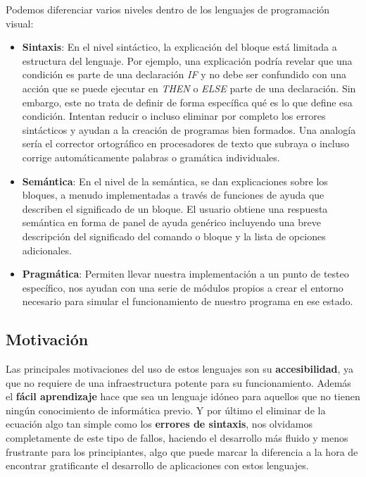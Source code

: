 Podemos diferenciar varios niveles dentro de los lenguajes de programación visual:
\begin{itemize}
\item \textbf{Sintaxis}: En el nivel sintáctico, la explicación del bloque está limitada a estructura del lenguaje. Por ejemplo, una explicación podría revelar que una condición es parte de una declaración \textit{IF} y no debe ser confundido con una acción que se puede ejecutar en \textit{THEN} o \textit{ELSE} parte de una declaración. Sin embargo, este no trata de definir de forma específica qué es lo que define esa condición.
Intentan reducir o incluso eliminar por completo los errores sintácticos y ayudan a la creación de programas bien formados. Una analogía sería el corrector ortográfico en procesadores de texto que subraya o incluso corrige automáticamente palabras o gramática individuales.

\item \textbf{Semántica}: En el nivel de la semántica, se dan explicaciones sobre los bloques, a menudo implementadas a través de funciones de ayuda que describen el significado
de un bloque. El usuario obtiene una respuesta semántica en forma de panel de ayuda genérico incluyendo una breve descripción del significado del comando o bloque y la lista de opciones adicionales.

\item \textbf{Pragmática}: Permiten llevar nuestra implementación a un punto de testeo específico, nos ayudan con una serie de módulos propios a crear el entorno necesario para simular el funcionamiento de nuestro programa en ese estado.
\end{itemize}

\subsection{Motivación}
\label{subsec:motivacion}

Las principales motivaciones del uso de estos lenguajes son su \textbf{accesibilidad}, ya que no requiere de una infraestructura potente para su funcionamiento.
Además el \textbf{fácil aprendizaje} hace que sea un lenguaje idóneo para aquellos que no tienen ningún conocimiento de informática previo.
Y por último el eliminar de la ecuación algo tan simple como los \textbf{errores de sintaxis}, nos olvidamos completamente de este tipo de fallos, haciendo el desarrollo más fluido y menos frustrante para los principiantes, algo que puede marcar la diferencia a la hora de encontrar gratificante el desarrollo de aplicaciones con estos lenguajes.

